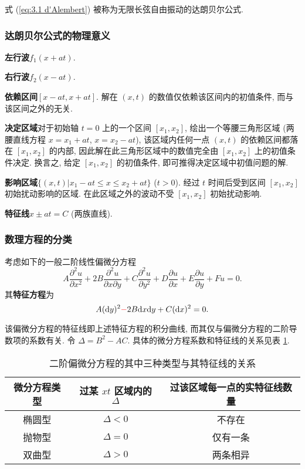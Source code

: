 式 (\ref{eq:3.1 d'Alembert}) 被称为无限长弦自由振动的达朗贝尔公式.

\subsubsection{达朗贝尔公式的物理意义}
\textbf{左行波}\quad $f_1(x+at)$.

\textbf{右行波}\quad $f_2(x-at)$.

\textbf{依赖区间}\quad $[x-at,x+at]$. 解在 $(x,t)$ 的数值仅依赖该区间内的初值条件, 而与该区间之外的无关.

\textbf{决定区域}\quad 对于初始轴 $t=0$ 上的一个区间 $[x_1,x_2]$, 绘出一个等腰三角形区域 (两腰直线方程 $x=x_1+at$, $x=x_2-at$), 该区域内任何一点 $(x,t)$ 的依赖区间都落在 $[x_1,x_2]$ 的内部, 因此解在此三角形区域中的数值完全由 $[x_1,x_2]$ 上的初值条件决定. 换言之, 给定 $[x_1,x_2]$ 的初值条件, 即可推得决定区域中初值问题的解.

\textbf{影响区域}\quad $\{(x,t)|x_1-at\leq x\leq x_2+at\}$ ($t>0$). 经过 $t$ 时间后受到区间 $[x_1,x_2]$ 初始扰动影响的区域. 在此区域之外的波动不受 $[x_1,x_2]$ 初始扰动影响.

\textbf{特征线}\quad $x\pm at=C$ (两族直线).

\subsubsection{数理方程的分类}
考虑如下的一般二阶线性偏微分方程
\begin{equation}
    A\frac{\partial^2u}{\partial x^2}+2B\frac{\partial^2u}{\partial x\partial y}+C\frac{\partial^2u}{\partial y^2}+D\frac{\partial u}{\partial x}+E\frac{\partial u}{\partial y}+Fu=0.
\end{equation}
其\textbf{特征方程}为
\begin{equation}
    A(\mathrm{d}y)^2{\color{red} -}2B\mathrm{d}x\mathrm{d}y+C(\mathrm{d}x)^2=0.
\end{equation}

该偏微分方程的特征线即上述特征方程的积分曲线, 而其仅与偏微分方程的二阶导数项的系数有关. 令 $\Delta=B^2-AC$. 具体的微分方程系数和特征线的关系见表 \ref{tab:3.1 eq feat}.
\begin{table}[H]
    \caption{二阶偏微分方程的其中三种类型与其特征线的关系} \label{tab:3.1 eq feat}
    \centering
    \begin{tabular}{ccc} \hline
        \bfseries 微分方程类型 & \bfseries 过某 $xt$ 区域内的 $\Delta$ & \bfseries 过该区域每一点的实特征线数量 \\ \hline
        椭圆型              & $\Delta<0$                      & 不存在                      \\ \hline
        抛物型              & $\Delta=0$                      & 仅有一条                     \\ \hline
        双曲型              & $\Delta>0$                      & 两条相异                     \\ \hline
    \end{tabular}
\end{table}

